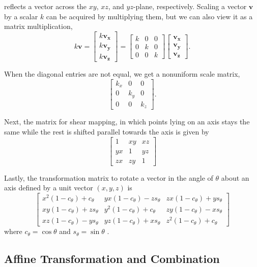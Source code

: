 \documentclass[conference]{IEEEtran}
\begin{document}
reflects a vector across the $xy$, $xz$, and $yz$-plane, respectively. Scaling a vector $\mathbf{v}$ by a scalar $k$ can be acquired by multiplying them, but we can also view it as a matrix multiplication,
\[
k\mathbf{v}
= \begin{bmatrix} k\mathbf{v_x} \\ k\mathbf{v_y} \\ k\mathbf{v_z} \end{bmatrix}
=
\begin{bmatrix}
    k & 0 & 0 \\
    0 & k & 0 \\
    0 & 0 & k
\end{bmatrix}
\begin{bmatrix} \mathbf{v_x} \\ \mathbf{v_y} \\ \mathbf{v_z} \end{bmatrix}.
\]


When the diagonal entries are not equal, we get a nonuniform scale matrix,
\[
\begin{bmatrix}
    k_x & 0 & 0 \\
    0 & k_y & 0 \\
    0 & 0 & k_z
\end{bmatrix}.
\]

Next, the matrix for shear mapping, in which points lying on an axis stays the same while the rest is shifted parallel towards the axis is given by
\[
\begin{bmatrix}
     1 & xy & xz \\
    yx &  1 & yz \\
    zx & zy & 1
\end{bmatrix}
\]

Lastly, the transformation matrix to rotate a vector in the angle of $\theta$ about an axis defined by a unit vector $(x, y, z)$ is
\[
{\begin{bmatrix}
x^2(1-c_\theta )+c_\theta &yx(1-c_\theta )-zs_\theta &zx(1-c_\theta )+ys_\theta \\
xy(1-c_\theta )+zs_\theta &y^2(1-c_\theta )+c_\theta &zy(1-c_\theta )-xs_\theta \\
xz(1-c_\theta )-ys_\theta &yz(1-c_\theta )+xs_\theta &z^2(1-c_\theta )+c_\theta 
\end{bmatrix}}
\]
where $c_\theta = \cos \theta$ and $s_\theta = \sin \theta$ \cite{lengyel}. 

\subsection{Affine Transformation and Combination}
\end{document}
